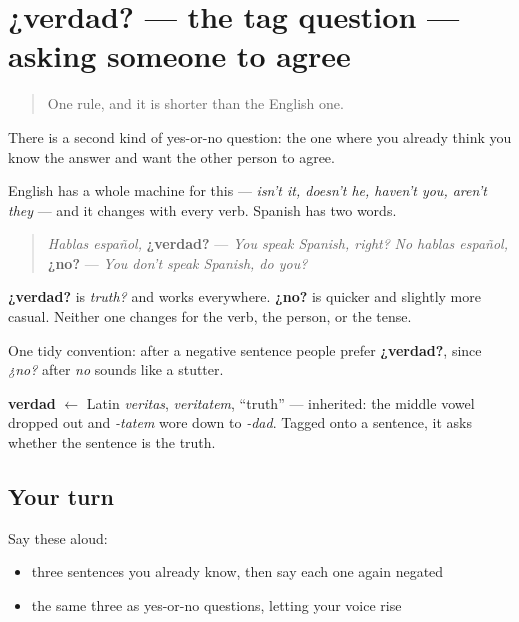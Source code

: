 \section[¿verdad?]{¿verdad? — the tag question — asking someone to agree}

\label{lesson:ES-C267-verdad-no}



\begin{quote}
One rule, and it is shorter than the English one.
\end{quote}

\begin{grammarlens}[title={Grammar lens: the tag question — asking someone to agree}]
There is a second kind of yes-or-no question: the one where you already think you know the answer and want the other person to agree.

English has a whole machine for this — \emph{isn't it, doesn't he, haven't you, aren't they} — and it changes with every verb. Spanish has two words.

\begin{quote}
\emph{Hablas español,} \textbf{¿verdad?} — \emph{You speak Spanish, right?} \emph{No hablas español,} \textbf{¿no?} — \emph{You don't speak Spanish, do you?}
\end{quote}

\textbf{¿verdad?} is \emph{truth?} and works everywhere. \textbf{¿no?} is quicker and slightly more casual. Neither one changes for the verb, the person, or the tense.

One tidy convention: after a negative sentence people prefer \textbf{¿verdad?}, since \emph{¿no?} after \emph{no} sounds like a stutter.
\end{grammarlens}

\begin{cousinweb}
\textbf{verdad} $\leftarrow$ Latin \emph{veritas}, \emph{veritatem}, \textquotedblleft{}truth\textquotedblright{} — inherited: the middle vowel dropped out and \emph{-tatem} wore down to \emph{-dad}. Tagged onto a sentence, it asks whether the sentence is the truth.
\end{cousinweb}

\subsection*{Your turn}
Say these aloud:

\begin{itemize}
\raggedright
  \item three sentences you already know, then say each one again negated
  \item the same three as yes-or-no questions, letting your voice rise
\end{itemize}

